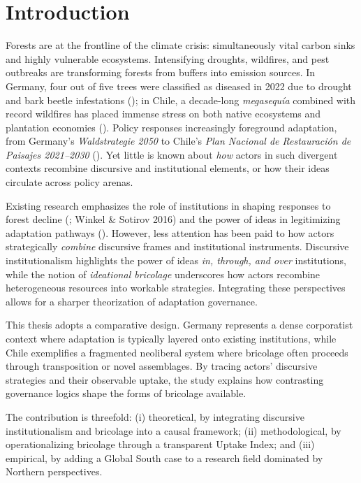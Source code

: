 
\section*{Introduction}

Forests are at the frontline of the climate crisis: simultaneously vital carbon
sinks and highly vulnerable ecosystems. Intensifying droughts, wildfires, and
pest outbreaks are transforming forests from buffers into emission sources. In
Germany, four out of five trees were classified as diseased in 2022 due to
drought and bark beetle infestations (\cite{BMEL2023}); in Chile, a decade-long
\emph{megasequía} combined with record wildfires has placed immense stress on
both native ecosystems and plantation economies (\cite{FAO2022}). Policy
responses increasingly foreground adaptation, from Germany’s
\emph{Waldstrategie 2050} to Chile’s \emph{Plan Nacional de Restauración de
Paisajes 2021–2030} (\cite{MMA2021}). Yet little is known about
\emph{how} actors in such divergent contexts recombine discursive and
institutional elements, or how their ideas circulate across policy arenas.

Existing research emphasizes the role of institutions in shaping responses to
forest decline (\cite{Winkel2011}; Winkel \& Sotirov 2016) and the power of ideas
in legitimizing adaptation pathways (\cite{Schmidt2008}). However, less attention
has been paid to how actors strategically \emph{combine} discursive frames and
institutional instruments. Discursive institutionalism highlights the power of
ideas \emph{in, through, and over} institutions, while the notion of
\emph{ideational bricolage} underscores how actors recombine heterogeneous
resources into workable strategies. Integrating these perspectives allows for a
sharper theorization of adaptation governance.

This thesis adopts a comparative design. Germany represents a dense corporatist
context where adaptation is typically layered onto existing institutions, while
Chile exemplifies a fragmented neoliberal system where bricolage often proceeds
through transposition or novel assemblages. By tracing actors’ discursive
strategies and their observable uptake, the study explains how contrasting
governance logics shape the forms of bricolage available.

The contribution is threefold: (i) theoretical, by integrating discursive
institutionalism and bricolage into a causal framework; (ii) methodological, by
operationalizing bricolage through a transparent Uptake Index; and (iii)
empirical, by adding a Global South case to a research field dominated by
Northern perspectives. 
